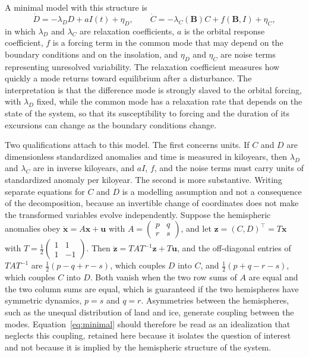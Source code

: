 \documentclass[11pt]{article}
\theoremstyle{definition}
\newcommand{\bB}{\mathbf{B}}
\begin{document}
A minimal model with this structure is
\begin{equation}
\dot D = -\lambda_D D + a I(t) + \eta_D, \qquad
\dot C = -\lambda_C(\bB) C + f(\bB, I) + \eta_C,
\label{eq:minimal}
\end{equation}
in which $\lambda_D$ and $\lambda_C$ are relaxation coefficients, $a$ is the orbital response coefficient, $f$ is a forcing term in the common mode that may depend on the boundary conditions and on the insolation, and $\eta_D$ and $\eta_C$ are noise terms representing unresolved variability. The relaxation coefficient measures how quickly a mode returns toward equilibrium after a disturbance. The interpretation is that the difference mode is strongly slaved to the orbital forcing, with $\lambda_D$ fixed, while the common mode has a relaxation rate that depends on the state of the system, so that its susceptibility to forcing and the duration of its excursions can change as the boundary conditions change.

Two qualifications attach to this model. The first concerns units. If $C$ and $D$ are dimensionless standardized anomalies and time is measured in kiloyears, then $\lambda_D$ and $\lambda_C$ are in inverse kiloyears, and $aI$, $f$, and the noise terms must carry units of standardized anomaly per kiloyear. The second is more substantive. Writing separate equations for $C$ and $D$ is a modelling assumption and not a consequence of the decomposition, because an invertible change of coordinates does not make the transformed variables evolve independently. Suppose the hemispheric anomalies obey $\dot{\mathbf{x}} = A\mathbf{x} + \mathbf{u}$ with $A = \begin{pmatrix} p & q \\ r & s \end{pmatrix}$, and let $\mathbf{z} = (C, D)^{\top} = T\mathbf{x}$ with $T = \tfrac12\begin{pmatrix} 1 & 1 \\ 1 & -1 \end{pmatrix}$. Then $\dot{\mathbf{z}} = TAT^{-1}\mathbf{z} + T\mathbf{u}$, and the off-diagonal entries of $TAT^{-1}$ are $\tfrac12(p - q + r - s)$, which couples $D$ into $C$, and $\tfrac12(p + q - r - s)$, which couples $C$ into $D$. Both vanish when the two row sums of $A$ are equal and the two column sums are equal, which is guaranteed if the two hemispheres have symmetric dynamics, $p = s$ and $q = r$. Asymmetries between the hemispheres, such as the unequal distribution of land and ice, generate coupling between the modes. Equation~\eqref{eq:minimal} should therefore be read as an idealization that neglects this coupling, retained here because it isolates the question of interest and not because it is implied by the hemispheric structure of the system.
\end{document}

